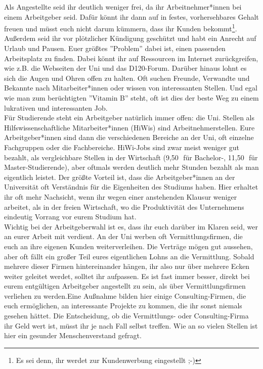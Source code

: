 {    Als Angestellte seid ihr deutlich weniger frei, da ihr Arbeitnehmer*innen bei einem Arbeitgeber seid. Dafür könnt ihr dann auf in festes, vorhersehbares Gehalt freuen und müsst euch nicht darum kümmern, dass ihr Kunden bekommt\footnote{Es sei denn, ihr werdet zur Kundenwerbung eingestellt ;-)}. Außerdem seid ihr vor plötzlicher Kündigung geschützt und habt ein Anrecht auf Urlaub und Pausen. Euer größtes ''Problem'' dabei ist, einen passenden Arbeitsplatz zu finden. Dabei könnt ihr auf Ressourcen im Internet zurückgreifen, wie z.B. die Webseiten der Uni und das D120-Forum. Darüber hinaus lohnt es sich die Augen und Ohren offen zu halten. Oft suchen Freunde, Verwandte und Bekannte nach Mitarbeiter*innen oder wissen von interessanten Stellen. Und egal wie man zum berüchtigten ''Vitamin B'' steht, oft ist dies der beste Weg zu einem lukrativen und interessanten Job. \\

    Für Studierende steht ein Arbeitgeber natürlich immer offen: die Uni.
    Stellen als Hilfswissenschaftliche Mitarbeiter*innen (HiWis) sind
    Arbeitnehmerstellen. Eure Arbeitgeber*innen sind dann die verschiedenen
    Bereiche an der Uni, oft einzelne Fachgruppen oder die Fachbereiche.
    HiWi-Jobs sind zwar meist weniger gut bezahlt, als vergleichbare Stellen in
    der Wirtschaft (9,50\,\EURtm ~für Bachelor-, 11,50\,\EURtm ~für Master-Studierende), aber oftmals werden deutlich mehr Stunden bezahlt als man eigentlich leistet. Der größte Vorteil ist, dass die Arbeitgeber*innen an der Universität oft Verständnis für die Eigenheiten des Studiums haben. Hier erhaltet ihr oft mehr Nachsicht, wenn ihr wegen einer anstehenden Klausur weniger arbeitet, als in der freien Wirtschaft, wo die Produktivität des Unternehmens eindeutig Vorrang vor eurem Studium hat. \\

    Wichtig bei der Arbeitgeberwahl ist es, dass ihr euch darüber im Klaren seid, wer an eurer Arbeit mit verdient. An der Uni werben oft Vermittlungsfirmen, die euch an ihre eigenen Kunden weiterverleihen. Die Verträge mögen gut aussehen, aber oft fällt ein großer Teil eures eigentlichen Lohns an die Vermittlung. Sobald mehrere dieser Firmen hintereinander hängen, ihr also nur über mehrere Ecken weiter geleitet werdet, solltet ihr aufpassen. Es ist fast immer besser, direkt bei eurem entgültigen Arbeitgeber angestellt zu sein, als über Vermittlungsfirmen verliehen zu werden.Eine Außnahme bilden hier einige Consulting-Firmen, die euch ermöglichen, an interessante Projekte zu kommen, die ihr sonst niemals gesehen hättet. Die Entscheidung, ob die Vermittlungs- oder Consulting-Firma ihr Geld wert ist, müsst ihr je nach Fall selbst treffen. Wie an so vielen Stellen ist hier ein gesunder Menschenverstand gefragt. \\

}
